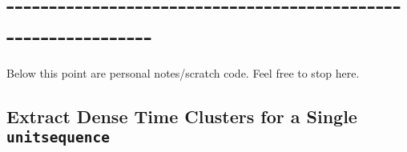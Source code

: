 \documentclass[11pt]{article}
\begin{document}
    \begin{center}
    \end{center}
    { \hspace*{\fill} \\}
    
    \begin{center}
    \end{center}
    { \hspace*{\fill} \\}
    
    \begin{center}
    \end{center}
    { \hspace*{\fill} \\}
    
    \section{-\/-\/-\/-\/-\/-\/-\/-\/-\/-\/-\/-\/-\/-\/-\/-\/-\/-\/-\/-\/-\/-\/-\/-\/-\/-\/-\/-\/-\/-\/-\/-\/-\/-\/-\/-\/-\/-\/-\/-\/-\/-\/-\/-\/-\/-\/-\/-\/-\/-\/-\/-\/-\/-\/-\/-\/-\/-\/-\/-\/-\/-\/-}\label{section}

Below this point are personal notes/scratch code. Feel free to stop
here.

    \subsection{\texorpdfstring{Extract Dense Time Clusters for a Single
\texttt{unitsequence}}{Extract Dense Time Clusters for a Single unitsequence}}\label{extract-dense-time-clusters-for-a-single-unitsequence}
\end{document}
